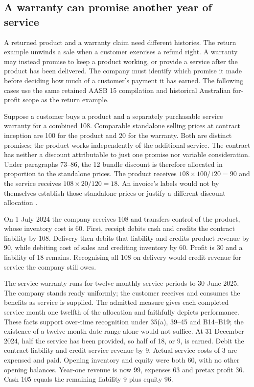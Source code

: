 \subsection{A warranty can promise another year of service}
\label{sec:service-warranty}

A returned product and a warranty claim need different histories. The return
example unwinds a sale when a customer exercises a refund right. A warranty
may instead promise to keep a product working, or provide a service after the
product has been delivered. The company must identify which promise it made
before deciding how much of a customer's payment it has earned. The following
cases use the same retained AASB 15 compilation and historical Australian
for-profit scope as the return example.

Suppose a customer buys a product and a separately purchasable service warranty
for a combined 108. Comparable standalone selling prices at contract inception
are 100 for the product and 20 for the warranty. Both are distinct promises;
the product works independently of the additional service. The contract has
neither a discount attributable to just one promise nor variable consideration.
Under paragraphs 73--86, the 12 bundle discount is therefore allocated in
proportion to the standalone prices. The product receives
$108\times100/120=90$ and the service receives $108\times20/120=18$.
An invoice's labels would not by themselves establish those standalone prices
or justify a different discount allocation \citep{aasb15dated}.

On 1 July 2024 the company receives 108 and transfers control of the product,
whose inventory cost is 60. First, receipt debits cash and credits the contract
liability by 108. Delivery then debits that liability and credits product
revenue by 90, while debiting cost of sales and crediting inventory by 60.
Profit is 30 and a liability of 18 remains. Recognising all 108 on delivery
would credit revenue for service the company still owes.

The service warranty runs for twelve monthly service periods to 30 June 2025.
The company stands ready uniformly; the customer receives and consumes the
benefits as service is supplied. The admitted measure gives each completed
service month one twelfth of the allocation and faithfully depicts performance.
These facts support over-time recognition under
35(a), 39--45 and B14--B19; the existence of a twelve-month date range alone
would not suffice. At 31 December 2024, half the service has been provided,
so half of 18, or 9, is earned. Debit the contract liability and credit
service revenue by 9. Actual service costs of 3 are expensed and paid.
Opening inventory and equity were both 60, with no other opening balances.
Year-one revenue is now 99, expenses 63 and pretax profit 36. Cash 105 equals
the remaining liability 9 plus equity 96.

